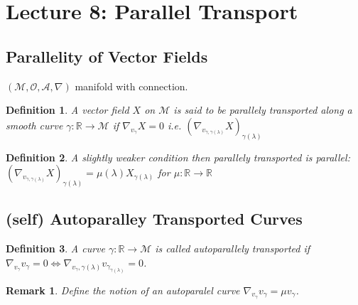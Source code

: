 \documentclass[10pt, oneside]{article}
\newcommand{\R}{\mathbb{R}}
\newcommand{\M}{\mathcal{M}}
\newtheorem{defn}{Definition}
\newtheorem{remark}{Remark}
\begin{document}
\section{Lecture 8: Parallel Transport}
   \subsection{Parallelity of Vector Fields}
   $(\M,\mathcal{O},\mathcal{A},\nabla)$ manifold with connection.
   \begin{defn}
      A vector field $X$ on $\M$ is said to be parallely transported along a smooth curve $\gamma: \R \to \M$ if $\nabla_{v_\gamma} X = 0$ i.e. $(\nabla_{v_{\gamma, \gamma(\lambda)}}X)_{\gamma (\lambda)}$
   \end{defn}
   \begin{defn}
      A slightly weaker condition then parallely transported is parallel: $(\nabla_{v_{\gamma,\gamma (\lambda)}} X)_{\gamma (\lambda)} = \mu (\lambda) X_{\gamma (\lambda)}$ for $\mu: \R \to \R$
   \end{defn}
   \subsection{(self) Autoparalley Transported Curves}
   \begin{defn}
   A curve $\gamma: \R \to \M$ is called autoparallely transported if $\nabla_{v_\gamma} v_\gamma = 0 \iff \nabla_{v_\gamma,\gamma (\lambda)} v_{\gamma_{\gamma(\lambda)}} = 0$.
   \end{defn}
   \begin{remark}
      Define the notion of an autoparalel curve $\nabla_{v_\gamma} v_\gamma = \mu v_\gamma$.
   \end{remark}
\end{document}

